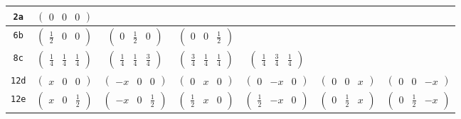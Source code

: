 \documentclass[fleqn,9pt,landscape]{jsarticle}
\begin{document}
\begin{center}
\begin{longtable}{ccccccc}
{\tt 2a} & $ \begin{pmatrix} 0 & 0 & 0 \end{pmatrix} $ & $  $ & $  $ & $  $ & $  $ & $  $ \\ \hline
{\tt 6b} & $ \begin{pmatrix} \frac{1}{2} & 0 & 0 \end{pmatrix} $ & $ \begin{pmatrix} 0 & \frac{1}{2} & 0 \end{pmatrix} $ & $ \begin{pmatrix} 0 & 0 & \frac{1}{2} \end{pmatrix} $ & $  $ & $  $ & $  $ \\ \hline
{\tt 8c} & $ \begin{pmatrix} \frac{1}{4} & \frac{1}{4} & \frac{1}{4} \end{pmatrix} $ & $ \begin{pmatrix} \frac{1}{4} & \frac{1}{4} & \frac{3}{4} \end{pmatrix} $ & $ \begin{pmatrix} \frac{3}{4} & \frac{1}{4} & \frac{1}{4} \end{pmatrix} $ & $ \begin{pmatrix} \frac{1}{4} & \frac{3}{4} & \frac{1}{4} \end{pmatrix} $ & $  $ & $  $ \\ \hline
{\tt 12d} & $ \begin{pmatrix} x & 0 & 0 \end{pmatrix} $ & $ \begin{pmatrix} - x & 0 & 0 \end{pmatrix} $ & $ \begin{pmatrix} 0 & x & 0 \end{pmatrix} $ & $ \begin{pmatrix} 0 & - x & 0 \end{pmatrix} $ & $ \begin{pmatrix} 0 & 0 & x \end{pmatrix} $ & $ \begin{pmatrix} 0 & 0 & - x \end{pmatrix} $ \\ \hline
{\tt 12e} & $ \begin{pmatrix} x & 0 & \frac{1}{2} \end{pmatrix} $ & $ \begin{pmatrix} - x & 0 & \frac{1}{2} \end{pmatrix} $ & $ \begin{pmatrix} \frac{1}{2} & x & 0 \end{pmatrix} $ & $ \begin{pmatrix} \frac{1}{2} & - x & 0 \end{pmatrix} $ & $ \begin{pmatrix} 0 & \frac{1}{2} & x \end{pmatrix} $ & $ \begin{pmatrix} 0 & \frac{1}{2} & - x \end{pmatrix} $ \\ \hline

\end{longtable}
\end{center}
\end{document}
